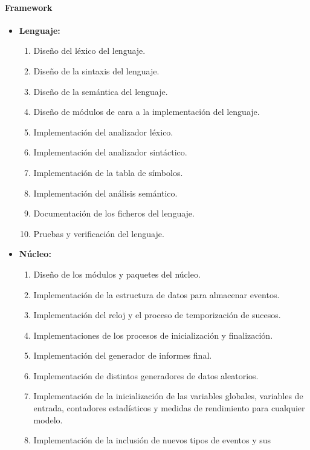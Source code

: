 \paragraph{Framework}
\begin{itemize}
    \item \textbf{Lenguaje:}
    \begin{enumerate}
        \item Diseño del léxico del lenguaje.
        \item Diseño de la sintaxis del lenguaje.
        \item Diseño de la semántica del lenguaje.
        \item Diseño de módulos de cara a la implementación del lenguaje.
        \item Implementación del analizador léxico.
        \item Implementación del analizador sintáctico.
        \item Implementación de la tabla de símbolos.
        \item Implementación del análisis semántico.
        \item Documentación de los ficheros del lenguaje.
        \item Pruebas y verificación del lenguaje.
    \end{enumerate}
    \item \textbf{Núcleo:}
    \begin{enumerate}
        \item Diseño de los módulos y paquetes del núcleo.
        \item Implementación de la estructura de datos para almacenar eventos.
        \item Implementación del reloj y el proceso de temporización de sucesos.
        \item Implementaciones de los procesos de inicialización y finalización.
        \item Implementación del generador de informes final.
        \item Implementación de distintos generadores de datos aleatorios.
        \item Implementación de la inicialización de las variables globales,
        variables de entrada, contadores estadísticos y medidas de rendimiento
        para cualquier modelo.
        \item Implementación de la inclusión de nuevos tipos de eventos y sus

\end{enumerate}
\end{itemize}
